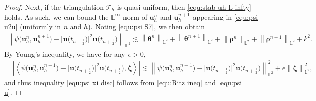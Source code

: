 \documentclass[11pt, reqno]{amsart}
\theoremstyle{definition}
\theoremstyle{remark}
\numberwithin{equation}{section}
\newcommand{\bff}{\boldsymbol}
\newcommand{\bb}{\mathbb}
\newcommand{\norm}[2]{\left\|{#1}\right\|_{#2}}
\newcommand{\inpro}[2]{\left\langle#1,#2\right\rangle}
\begin{document}
\begin{proof}
Next, if the triangulation $\mathcal{T}_h$ is quasi-uniform, then \eqref{equ:stab uh L infty} holds. As such, we can bound the $\bb{L}^\infty$ norm of $\bff{u}_h^n$ and $\bff{u}_h^{n+1}$ appearing in \eqref{equ:psi u2u} (uniformly in $n$ and $h$). Noting \eqref{equ:psi S7}, we then obtain
\begin{align}\label{equ:psi u}
	\norm{\psi\big(\bff{u}_h^n, \bff{u}_h^{n+1}\big) - \big|\bff{u}\big(t_{n+\frac{1}{2}}\big)\big|^2 \bff{u}\big(t_{n+\frac{1}{2}}\big)}{\bb{L}^2}
	\lesssim
	\norm{\bff{\theta}^n}{\bb{L}^2} + \norm{\bff{\theta}^{n+1}}{\bb{L}^2}
	+ \norm{\bff{\rho}^n}{\bb{L}^2} + \norm{\bff{\rho}^{n+1}}{\bb{L}^2} + k^2.
\end{align} 
By Young's inequality, we have for any $\epsilon >0$,
\begin{align*}
	&\left| \inpro{\psi\big(\bff{u}_h^n, \bff{u}_h^{n+1}\big) - \big|\bff{u}\big(t_{n+\frac{1}{2}}\big)\big|^2 \bff{u}\big(t_{n+\frac{1}{2}}\big)}{\bff{\zeta}} \right| 
	\lesssim
	\norm{\psi\big(\bff{u}_h^n, \bff{u}_h^{n+1}\big) - \big|\bff{u}\big(t_{n+\frac{1}{2}}\big)\big|^2 \bff{u}\big(t_{n+\frac{1}{2}}\big)}{\bb{L}^2}^2
	+
	\epsilon \norm{\bff{\zeta}}{\bb{L}^2}^2,
\end{align*}
and thus inequality \eqref{equ:psi xi disc} follows from \eqref{equ:Ritz ineq} and \eqref{equ:psi u}.


\end{proof}
\end{document}
